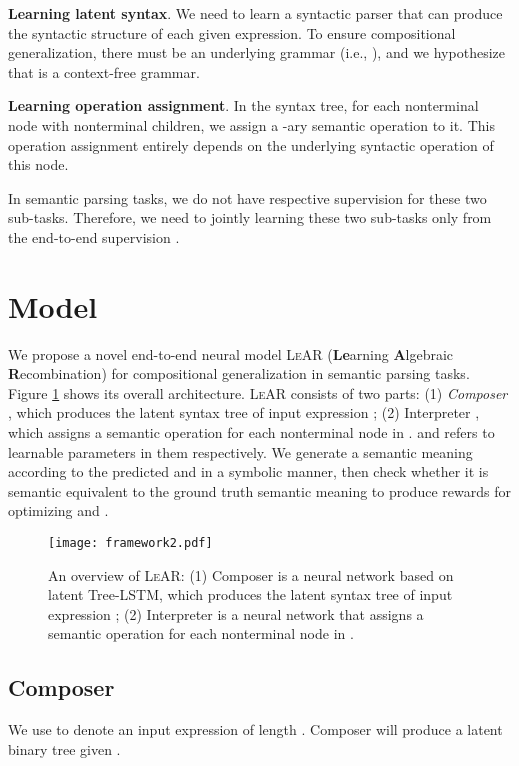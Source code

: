 \documentclass[11pt,a4paper]{article}
\begin{document}
\noindent \textbf{Learning latent syntax}.
We need to learn a syntactic parser that can produce the syntactic structure of each given expression.
To ensure compositional generalization, there must be an underlying grammar (i.e., ), and we hypothesize that  is a context-free grammar.


\noindent \textbf{Learning operation assignment}.
In the syntax tree, for each nonterminal node with  nonterminal children, we assign a -ary semantic operation to it.
This operation assignment entirely depends on the underlying syntactic operation  of this node.

In semantic parsing tasks, we do not have respective supervision for these two sub-tasks.
Therefore, we need to jointly learning these two sub-tasks only from the end-to-end supervision .

\section{Model}\label{sec:Model}

We propose a novel end-to-end neural model \textsc{LeAR} (\textbf{Le}arning \textbf{A}lgebraic \textbf{R}ecombination) for compositional generalization in semantic parsing tasks.
Figure \ref{fig:framework} shows its overall architecture.
\textsc{LeAR} consists of two parts:
(1) \emph{Composer} , which produces the latent syntax tree  of input expression ;
(2) Interpreter , which assigns a semantic operation for each nonterminal node in .
 and  refers to learnable parameters in them respectively.
We generate a semantic meaning  according to the predicted  and  in a symbolic manner, then check whether it is semantic equivalent to the ground truth semantic meaning  to produce rewards for optimizing  and .

\begin{figure}[t]
    \centering
    \texttt{[image: framework2.pdf]}
    \caption{An overview of \textsc{LeAR}: (1) Composer  is a neural network based on latent Tree-LSTM, which produces the latent syntax tree  of input expression ; (2) Interpreter  is a neural network that assigns a semantic operation for each nonterminal node in .}
    \label{fig:framework}
\end{figure}

\subsection{Composer}

We use  to denote an input expression of length .
Composer  will produce a latent binary tree  given .
\end{document}
